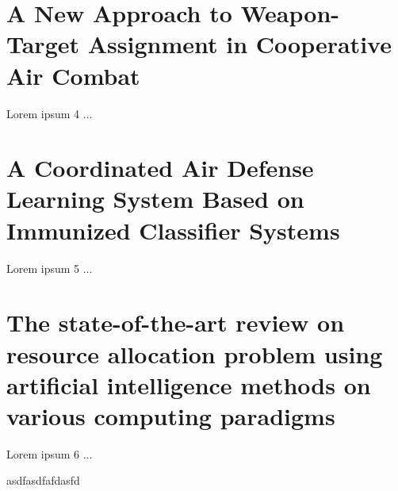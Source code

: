 \documentclass[12pt]{article} %
\begin{document}
\section*{A New Approach to Weapon-Target Assignment in Cooperative Air Combat \cite{swarmHarmony_chang_2017}}
Lorem ipsum 4 $\ldots$


\section*{A Coordinated Air Defense Learning System Based on Immunized Classifier Systems \cite{immunized_nantogma_2021}}
Lorem ipsum 5 $\ldots$


\section*{The state-of-the-art review on resource allocation problem using artificial intelligence methods on various computing paradigms \cite{resourceAlloc_joloudari_2022}}
Lorem ipsum 6 $\ldots$






asdfasdfafdasfd
\end{document}
